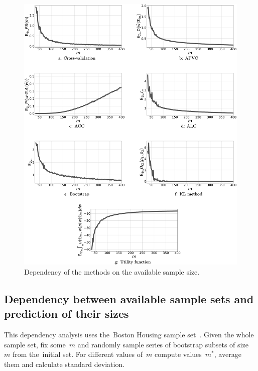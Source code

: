 \documentclass[
11pt,%
tightenlines,%
twoside,%
onecolumn,%
nofloats,%
nobibnotes,%
nofootinbib,%
superscriptaddress,%
noshowpacs,%
centertags]%
{revtex4}
\begin{document}
\begin{figure}[h!]
\includegraphics[width=1.0\textwidth]{fig1}
\caption{Dependency of the methods on the available sample size.}
\label{fig1}
\end{figure}

\subsection{Dependency between available sample sets and prediction of their sizes}
This dependency analysis uses the~Boston Housing sample set~\cite{boston}. Given the whole sample set, fix some~$m$ and randomly sample series of bootstrap subsets of size~$m$ from the~initial set. For different values of~$m$ compute values~$m^*$, average them and calculate standard deviation. 
 
\end{document}
